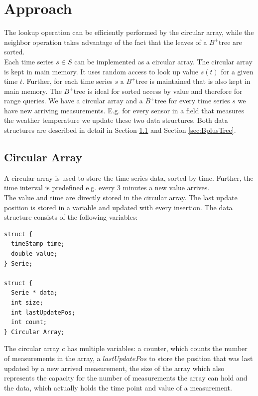\documentclass[abstracton,12pt]{scrreprt}
\begin{document}
\chapter{Approach}
\label{sec:Approach}
The lookup operation can be efficiently performed by the circular array, while the neighbor operation takes advantage of the fact that the leaves of a $B^+$tree are sorted. \\
Each time series $s \in S$ can be implemented as a circular array. The circular array is kept in main memory. It uses random access to look up value $s(t)$ for a given time $t$. Further, for each time series $s$ a $B^+$tree is maintained that is also kept in main memory. The $B^+$tree is ideal for sorted access by value and therefore for range queries. We have a circular array and a $B^+$tree for every time series $s$ we have new arriving measurements. E.g. for every sensor in a field that measures the weather temperature we update these two data structures. Both data structures are described in detail in Section \ref{sec:circularArray} and Section \ref{sec:BplusTree}.


\section{Circular Array}
\label{sec:circularArray}
A circular array is used to store the time series data, sorted by time. Further, the time interval is predefined e.g. every 3 minutes a new value arrives.\\ The value and time are directly stored in the circular array. The last update position is stored in a variable and updated with every insertion. The data structure consists of the following variables: 

\lstset{language=C}
\begin{lstlisting}
struct {
  timeStamp time;
  double value;
} Serie;
	
struct {
  Serie * data;
  int size;
  int lastUpdatePos;
  int count;
} Circular Array;
\end{lstlisting}
\BlankLine
The circular array $c$ has multiple variables: a counter, which counts the number of measurements in the array, a $lastUpdatePos$ to store the position that was last updated by a new arrived measurement, the size of the array which also represents the capacity for the number of measurements the array can hold and the data, which actually holds the time point and value of a measurement.
\end{document}
